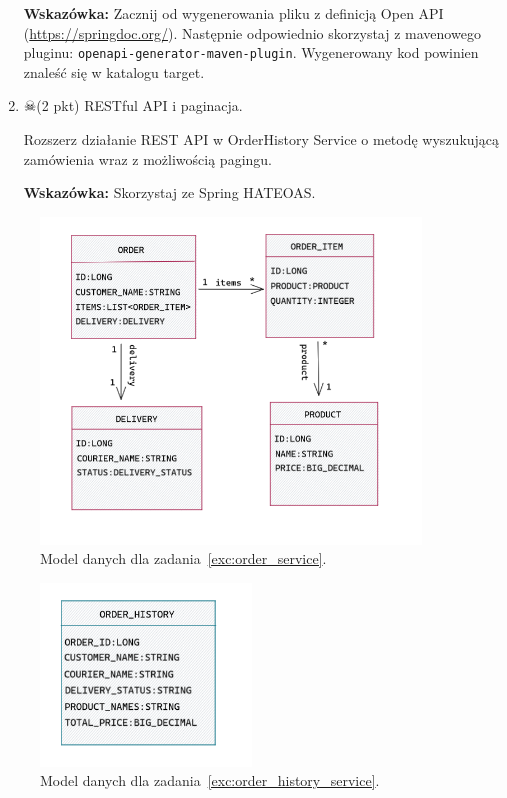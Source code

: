 \documentclass[12pt]{article}
\begin{document}
\begin{enumerate}
            \textbf{Wskazówka:} Zacznij od wygenerowania pliku z definicją Open API (\url{https://springdoc.org/}). Następnie odpowiednio skorzystaj z mavenowego pluginu: \texttt{openapi-gene\-ra\-tor-ma\-ven-plu\-gin}. Wygenerowany kod powinien znaleść się w katalogu target.
        \item\label{exc:openapi}
        $\skull$(2 pkt) RESTful API i paginacja.

            Rozszerz działanie REST API w OrderHistory Service o metodę wyszukującą zamówienia wraz z możliwością pagingu.

            \textbf{Wskazówka:} Skorzystaj ze Spring HATEOAS.
    \end{enumerate}
    \begin{figure}[p]
        \centering
        \includegraphics[width=0.9\textwidth]{cud_model.png}
        \caption{Model danych dla zadania~\ref{exc:order_service}.}
        \label{fig:cud-model}
    \end{figure}
    \begin{figure}[p]
        \centering
        \includegraphics[width=0.5\textwidth]{read-model.png}
        \caption{Model danych dla zadania~\ref{exc:order_history_service}.}
        \label{fig:read-model}
    \end{figure}
\end{document}
